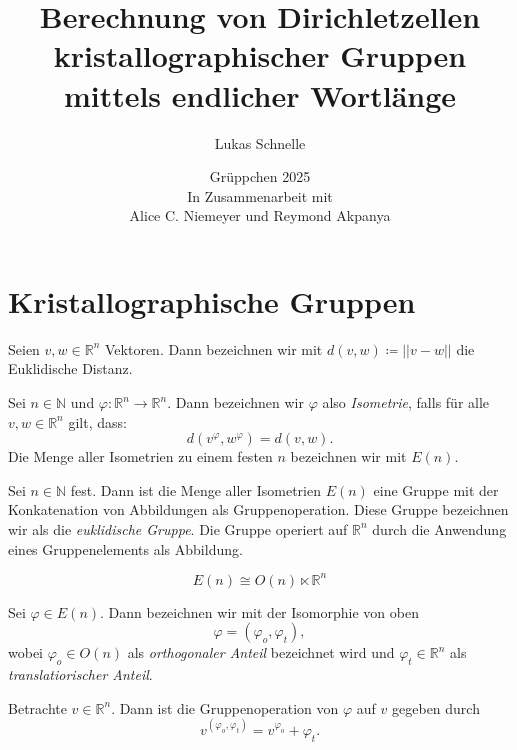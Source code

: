 \documentclass{beamer}
\title{Berechnung von Dirichletzellen kristallographischer Gruppen mittels endlicher Wortlänge }
\author{Lukas Schnelle}
\date{Grüppchen 2025 \\ In Zusammenarbeit mit \\Alice C. Niemeyer und Reymond Akpanya}
\theoremstyle{plain}
\newcommand\R{\mathbb R}
\newcommand\N{\mathbb N}
\renewcommand{\phi}{\varphi}
\begin{document}
\frame[plain]{\titlepage}

\section{Kristallographische Gruppen}
\begin{frame}
    \begin{notation}
        Seien $v, w \in \R^n$ Vektoren. \pause 
        Dann bezeichnen wir mit $d(v, w) \coloneqq ||v - w ||$ die Euklidische Distanz.
    \end{notation}
    \pause
    \begin{definition}
        Sei $n \in \N$ und $\phi: \R^n \to \R^n$. Dann bezeichnen wir $\phi$ also \emph{Isometrie}, falls für alle $v, w \in \R^n$ gilt, dass:
        $$
            d(v^\phi, w^\phi) = d(v, w).
        $$\pause
        Die Menge aller Isometrien zu einem festen $n$ bezeichnen wir mit $E(n)$.
    \end{definition}
\end{frame}

\begin{frame}
    \begin{proposition}
        Sei $n \in \N$ fest. Dann ist die Menge aller Isometrien $E(n)$ eine Gruppe mit der Konkatenation von Abbildungen als Gruppenoperation.
        Diese Gruppe bezeichnen wir als die \emph{euklidische Gruppe}. Die Gruppe operiert auf $\R^n$ durch die Anwendung eines Gruppenelements als Abbildung.
    \end{proposition}
\end{frame}

\begin{frame}
    \begin{proposition}
        $$
            E(n) \cong O(n) \ltimes \R^n
        $$
    \end{proposition}
    \pause
    \begin{notation}
        Sei $\phi \in E(n)$. Dann bezeichnen wir mit der Isomorphie von oben
        $$
            \phi = (\phi_o, \phi_t),
        $$
        wobei $\phi_o \in O(n)$ als \emph{orthogonaler Anteil} bezeichnet wird und $\phi_t \in \R^n$ als \emph{translatiorischer Anteil}.
    \end{notation}
    Betrachte $v \in \R^n$. Dann ist die Gruppenoperation von $\phi$ auf $v$ gegeben durch
    $$
        v^{(\phi_o, \phi_t)} = v^{\phi_o} + \phi_t.
    $$
\end{frame}
\end{document}
